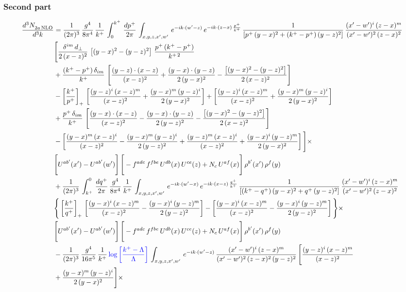 \documentclass[9pt]{article}
\numberwithin{equation}{section}
\begin{document}
\subsubsection*{Second part}
\begin{align}
    \frac{d^{3}N_{2a\,\rm NLO}^{\rm}}{d^{3}k}  & =  \frac{1}{(2\pi)^{3}}\, \frac{g^{4}}{8\pi^{4}}\,\frac{1}{k^{+}}\,\int_{0}^{k^{+}}\, \frac{dp^{+}}{2\pi}\,\int_{x,y,z,x',w'}\,e^{-ik\cdot(w'-z)}\,e^{-ik\cdot (z-x)\,\frac{p^{+}}{k^{+}}}\,\frac{1}{\left[p^{+}\,(y-x)^{2}+(k^{+}-p^{+})\,(y-z)^{2}\right]}\, \frac{(x'-w')^{i}\,(z-x)^{m}}{(x'-w')^{2}\,(z-x)^{2}} \notag \\ & \Bigg[\frac{\delta^{im}\,d_{\perp}}{2\,(x-z)^{2}}\,\left[(y-x)^{2}-(y-z)^{2}\right]\,\frac{p^{+}\,(k^{+}-p^{+})}{k^{+\,2}}\notag \\ & +\frac{(k^{+}-p^{+})\,\delta_{im}}{k^{+}}\,\left[\frac{(y-z)\cdot (x-z)}{(x-z)^{2}}+\frac{(y-x)\cdot (y-z)}{2\,(y-x)^{2}}-\frac{\left[(y-x)^{2}-(y-z)^{2}\right]}{2\,(x-z)^{2}}\right]\notag \\ & -\left[\frac{k^{+}}{p^{+}}\right]_{+}\,\left[\frac{(y-z)^{i}\,(x-z)^{m}}{(x-z)^{2}}+\frac{(y-x)^{m}\,(y-z)^{i}}{2\,(y-x)^{2}}\right]+ \left[\frac{(y-z)^{i}\,(x-z)^{m}}{(x-z)^{2}}+\frac{(y-x)^{m}\,(y-z)^{i}}{2\,(y-x)^{2}}\right]\notag \\ & +\frac{p^{+}\,\delta_{im}}{k^{+}}\,\left[\frac{(y-x)\cdot (x-z)}{(x-z)^{2}}-\frac{(y-x)\cdot (y-z)}{2\,(y-z)^{2}}-\frac{\left[(y-x)^{2}-(y-z)^{2}\right]}{2\,(x-z)^{2}}\right]\notag \\ &-\left[\frac{(y-x)^{m}\,(x-z)^{i}}{(x-z)^{2}}-\frac{(y-x)^{m}\,(y-z)^{i}}{2\,(y-z)^{2}}+\frac{(y-z)^{m}\,(x-z)^{i}}{(x-z)^{2}}+\frac{(y-x)^{i}\,(y-z)^{m}}{2\,(y-x)^{2}}\right]\Bigg]\times \notag \\ & \Bigg[U^{ab'}(x')-U^{ab'}(w')\Bigg]\,\Bigg[-f^{adc}\,f^{fbe}\,U^{db}(x)\,U^{ce}(z)+N_{c}\,U^{af}(x)\Bigg]\,\rho^{b'}(x')\,\rho^{f}(y)\notag \\ & + \frac{1}{(2\pi)^{3}}\,\int^{0}_{k^{+}}\, \frac{dq^{+}}{2\pi} \,\frac{g^{4}}{8\pi^{4}}\,\frac{1}{k^{+}}\, \int_{x,y,z,x',w'}\,e^{-ik\cdot(w'-x)}\,e^{-ik\cdot (x-z)\,\frac{q^{+}}{k^{+}}}\, \frac{1}{\left[(k^{+}-q^{+})\,(y-x)^{2}+q^{+}\,(y-z)^{2}\right]}\, \frac{(x'-w')^{i}\,(z-x)^{m}}{(x'-w')^{2}\,(z-x)^{2}} \notag \\ &\Bigg\{\left[\frac{k^{+}}{q^{+}}\right]_{+}\,\left[\frac{(y-x)^{i}\,(x-z)^{m}}{(x-z)^{2}}-\frac{(y-x)^{i}\,(y-z)^{m}}{2\,(y-z)^{2}}\right] -\left[\frac{(y-x)^{i}\,(x-z)^{m}}{(x-z)^{2}}-\frac{(y-x)^{i}\,(y-z)^{m}}{2\,(y-z)^{2}}\right]\Bigg\}\times\,\notag \\ & \Bigg[U^{ab'}(x')-U^{ab'}(w')\Bigg]\,\Bigg[-f^{adc}\,f^{fbe}\,U^{db}(x)\,U^{ce}(z)+N_{c}\,U^{af}(x)\Bigg]\,\rho^{b'}(x')\,\rho^{f}(y)\notag \\ & - \frac{1}{(2\pi)^{3}}\, \frac{g^{4}}{16\pi^{5}}\,\frac{1}{k^{+}}\,{\color{blue}\log{\left[\frac{k^{+}-\Lambda}{\Lambda}\right]}}\, \int_{x,y,z,x',w'}\, e^{-ik\cdot(w'-z)}\,\frac{(x'-w')^{i}\,(z-x)^{m}}{(x'-w')^{2}\,(z-x)^{2}\, (y-z)^{2}}\,\Bigg[\frac{(y-z)^{i}\,(x-z)^{m}}{(x-z)^{2}}\notag \\ & +\frac{(y-x)^{m}\,(y-z)^{i}}{2\,(y-x)^{2}}\Bigg]\times\, 
\end{align}
\end{document}
